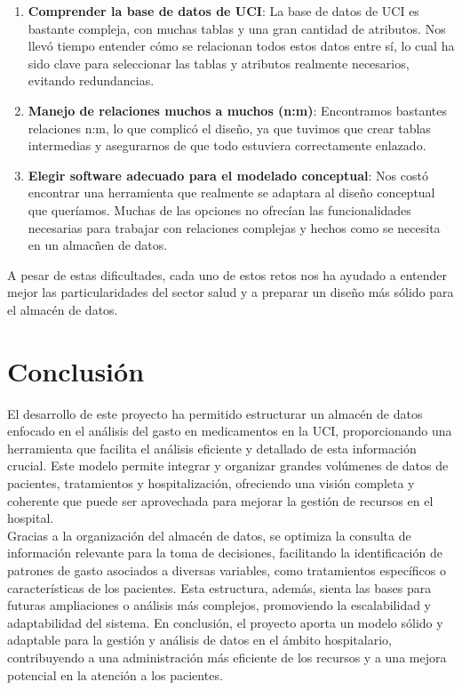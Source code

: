 \documentclass{article}
\begin{document}
\begin{enumerate}
	\item \textbf{Comprender la base de datos de UCI}: La base de datos de UCI es bastante compleja, con muchas tablas y una gran cantidad de atributos. Nos llevó tiempo entender cómo se relacionan todos estos datos entre sí, lo cual ha sido clave para seleccionar las tablas y atributos realmente necesarios, evitando redundancias.
	
	\item \textbf{Manejo de relaciones muchos a muchos (n:m)}: Encontramos bastantes relaciones n:m, lo que complicó el diseño, ya que tuvimos que crear tablas intermedias y asegurarnos de que todo estuviera correctamente enlazado.
	
	\item \textbf{Elegir software adecuado para el modelado conceptual}: Nos costó encontrar una herramienta que realmente se adaptara al diseño conceptual que queríamos. Muchas de las opciones no ofrecían las funcionalidades necesarias para trabajar con relaciones complejas y hechos como se necesita en un almacñen de datos.


\end{enumerate}

A pesar de estas dificultades, cada uno de estos retos nos ha ayudado a entender mejor las particularidades del sector salud y a preparar un diseño más sólido para el almacén de datos.
\section{Conclusión}
\label{sec:conclusion}


El desarrollo de este proyecto ha permitido estructurar un almacén de datos enfocado en el análisis del gasto en medicamentos en la UCI, proporcionando una herramienta que facilita el análisis eficiente y detallado de esta información crucial. Este modelo permite integrar y organizar grandes volúmenes de datos de pacientes, tratamientos y hospitalización, ofreciendo una visión completa y coherente que puede ser aprovechada para mejorar la gestión de recursos en el hospital.
\\

Gracias a la organización del almacén de datos, se optimiza la consulta de información relevante para la toma de decisiones, facilitando la identificación de patrones de gasto asociados a diversas variables, como tratamientos específicos o características de los pacientes. Esta estructura, además, sienta las bases para futuras ampliaciones o análisis más complejos, promoviendo la escalabilidad y adaptabilidad del sistema. En conclusión, el proyecto aporta un modelo sólido y adaptable para la gestión y análisis de datos en el ámbito hospitalario, contribuyendo a una administración más eficiente de los recursos y a una mejora potencial en la atención a los pacientes.
\end{document}
